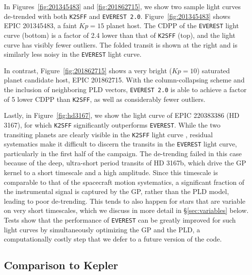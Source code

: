 \documentclass[]{emulateapj}
\newcommand{\Kp}{\ensuremath{Kp}}
\newcommand{\edited}[1]{{\color{red} #1}}
\begin{document}
In Figures~\ref{fig:201345483} and \ref{fig:201862715},  we show two sample light curves
de-trended with both \texttt{K2SFF} and \texttt{EVEREST 2.0}. Figure~\ref{fig:201345483}
shows EPIC 201345483, a faint $\Kp = 15$ planet host.
The CDPP of the \texttt{EVEREST} light curve (bottom) is a factor of 2.4 lower than that of
\texttt{K2SFF} (top), and the light curve has visibly fewer outliers. The folded transit
is shown at the right and is similarly less noisy in the \texttt{EVEREST} light curve.

In contrast, Figure~\ref{fig:201862715} shows a very bright ($\Kp = 10$) saturated
planet candidate host, EPIC 201862715. With the column-collapsing scheme and the
inclusion of neighboring PLD vectors, \texttt{EVEREST 2.0} is able to achieve a factor
of 5 lower CDPP than \texttt{K2SFF}, as well as considerably fewer outliers.

\edited{Lastly, in Figure~\ref{fig:hd3167}, we show the light curve of EPIC 220383386 (HD 3167),
for which \texttt{K2SFF} significantly outperforms \texttt{EVEREST}. While the two
transiting planets are clearly visible in the \texttt{K2SFF} light curve
\citep[an ultra-short period planet at a period of 0.96 days and a planet at a period of
29.85 days;][]{Vanderburg16}, residual systematics make it difficult to discern the
transits in the \texttt{EVEREST} light curve, particularly in the first half of the
campaign. The de-trending failed in this case because of the deep, ultra-short period transits
of HD 3167b, which drive the GP kernel to a short timescale and a high amplitude. Since this
timescale is comparable to that of the spacecraft motion systematics, a significant fraction of the
instrumental signal is captured by the GP, rather than the PLD model, leading to poor
de-trending. This tends to also happen for stars that are variable on very short timescales,
which we discuss in more detail in \S\ref{sec:variables} below. Tests show that the performance
of \texttt{EVEREST} can be greatly improved for such light curves by simultaneously optimizing the
GP and the PLD, a computationally costly step that we defer to a future version of the code.}

\subsection{Comparison to Kepler}
\label{sec:kepler}
\end{document}
